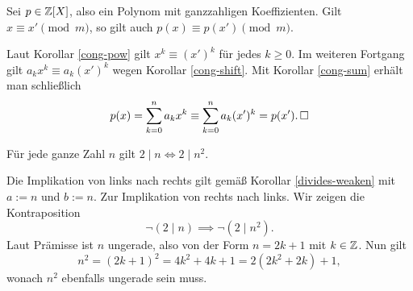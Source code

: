\begin{Korollar}
Sei $p\in\mathbb Z[X]$, also ein Polynom mit ganzzahligen Koeffizienten.
Gilt $x\equiv x'\pmod m$, so gilt auch $p(x)\equiv p(x')\pmod m$.
\end{Korollar}
\begin{Beweis}
Laut Korollar \ref{cong-pow} gilt $x^k\equiv (x')^k$ für jedes
$k\ge 0$. Im weiteren Fortgang gilt $a_k x^k\equiv a_k (x')^k$
wegen Korollar \ref{cong-shift}. Mit Korollar \ref{cong-sum} erhält man
schließlich
\[p(x) = \sum_{k=0}^n a_k x^k\equiv\sum_{k=0}^n a_k (x')^k = p(x').\,\square\]
\end{Beweis}

\begin{Satz}
Für jede ganze Zahl $n$ gilt $2\mid n \iff 2\mid n^2$.
\end{Satz}
\begin{Beweis}
Die Implikation von links nach rechts gilt gemäß
Korollar \ref{divides-weaken} mit $a:=n$ und $b:=n$.
Zur Implikation von rechts nach links. Wir zeigen die Kontraposition
\[\neg(2\mid n) \implies \neg(2\mid n^2).\]
Laut Prämisse ist $n$ ungerade, also von der Form $n=2k+1$ mit $k\in\mathbb Z$.
Nun gilt
\[n^2 = (2k+1)^2 = 4k^2 + 4k + 1 = 2(2k^2 + 2k) + 1,\]
wonach $n^2$ ebenfalls ungerade sein muss.\,\qedsymbol
\end{Beweis}
